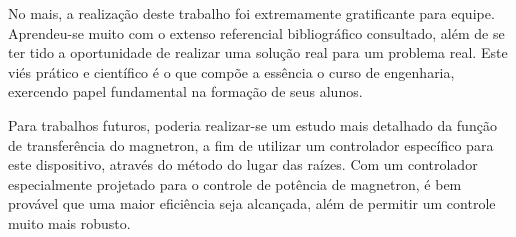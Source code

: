No mais, a realização deste trabalho foi extremamente gratificante para equipe. Aprendeu-se muito com o extenso referencial bibliográfico consultado, além de se ter tido a oportunidade de realizar uma solução real para um problema real. Este viés prático e científico é o que compõe a essência o curso de engenharia, exercendo papel fundamental na formação de seus alunos.

Para trabalhos futuros, poderia realizar-se um estudo mais detalhado da função de transferência do magnetron, a fim de utilizar um controlador específico para este dispositivo, através do método do lugar das raízes. Com um controlador especialmente projetado para o controle de potência de magnetron, é bem provável que uma maior eficiência seja alcançada, além de permitir um controle muito mais robusto.